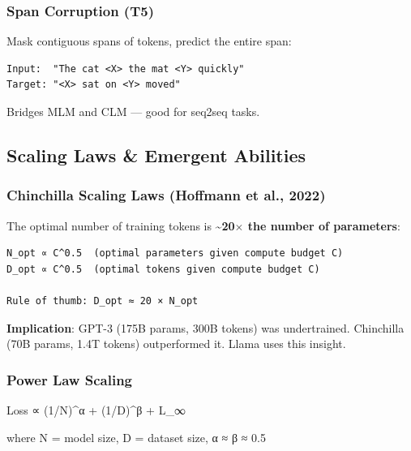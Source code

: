 \documentclass[11pt]{article}
\newenvironment{Shaded}{\begin{snugshade}}{\end{snugshade}}
\newcommand{\DecValTok}[1]{\textcolor[rgb]{0.96,0.45,0.00}{#1}}
\newcommand{\FloatTok}[1]{\textcolor[rgb]{0.96,0.45,0.00}{#1}}
\newcommand{\NormalTok}[1]{\textcolor[rgb]{0.81,0.81,0.76}{#1}}
\newcommand{\OperatorTok}[1]{\textcolor[rgb]{0.81,0.81,0.76}{#1}}
\begin{document}
\subsubsection{Span Corruption (T5)}\label{span-corruption-t5}

Mask contiguous spans of tokens, predict the entire span:

\setcodelang{}

\begin{verbatim}
Input:  "The cat <X> the mat <Y> quickly"
Target: "<X> sat on <Y> moved"
\end{verbatim}

Bridges MLM and CLM --- good for seq2seq tasks.

\subsection{Scaling Laws \& Emergent Abilities}\label{scaling-laws--emergent-abilities}

\subsubsection{Chinchilla Scaling Laws (Hoffmann et al., 2022)}\label{chinchilla-scaling-laws-hoffmann-et-al-2022}

The optimal number of training tokens is \textbf{\textasciitilde20\(\times\) the number of parameters}:

\setcodelang{}

\begin{verbatim}
N_opt ∝ C^0.5  (optimal parameters given compute budget C)
D_opt ∝ C^0.5  (optimal tokens given compute budget C)

Rule of thumb: D_opt ≈ 20 × N_opt
\end{verbatim}

\textbf{Implication}: GPT-3 (175B params, 300B tokens) was undertrained. Chinchilla (70B params, 1.4T tokens) outperformed it. Llama uses this insight.

\subsubsection{Power Law Scaling}\label{power-law-scaling}


\begin{Shaded}
\begin{Highlighting}[]
\NormalTok{Loss ∝ (}\DecValTok{1}\OperatorTok{/}\NormalTok{N)}\OperatorTok{\^{}}\NormalTok{α }\OperatorTok{+}\NormalTok{ (}\DecValTok{1}\OperatorTok{/}\NormalTok{D)}\OperatorTok{\^{}}\NormalTok{β }\OperatorTok{+}\NormalTok{ L\_∞}

\NormalTok{where N }\OperatorTok{=}\NormalTok{ model size, D }\OperatorTok{=}\NormalTok{ dataset size, α ≈ β ≈ }\FloatTok{0.5}
\end{Highlighting}
\end{Shaded}
\end{document}

